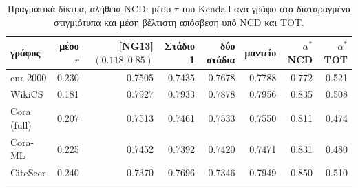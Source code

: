 \begin{table}[!htbp]
\centering
\footnotesize
\caption{Πραγματικά δίκτυα, αλήθεια NCD: μέσο $\tau$ του Kendall ανά γράφο στα διαταραγμένα στιγμιότυπα και μέση βέλτιστη απόσβεση υπό NCD και TOT.}
\label{tab:realdetail}
\begin{tabular}{@{}lrrrrrrr@{}}
\toprule
γράφος & μέσο $r$ & [NG13] $(0.118,0.85)$ & Στάδιο 1 & δύο στάδια & μαντείο & $\alpha^*$ NCD & $\alpha^*$ TOT \\
\midrule
cnr-2000 & 0.230 & 0.7505 & 0.7435 & 0.7678 & 0.7788 & 0.772 & 0.521 \\
WikiCS & 0.181 & 0.7927 & 0.7933 & 0.7878 & 0.7956 & 0.835 & 0.508 \\
Cora (full) & 0.207 & 0.7513 & 0.7461 & 0.7533 & 0.7550 & 0.811 & 0.474 \\
Cora-ML & 0.225 & 0.7452 & 0.7392 & 0.7420 & 0.7471 & 0.831 & 0.480 \\
CiteSeer & 0.240 & 0.7370 & 0.7696 & 0.7346 & 0.7949 & 0.850 & 0.510 \\
\bottomrule
\end{tabular}
\end{table}
